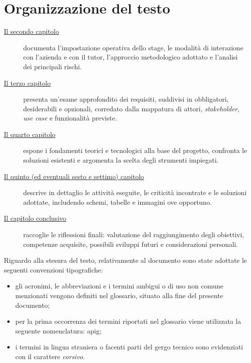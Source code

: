 \section{Organizzazione del testo}
\begin{description}
    \item[{\hyperref[chap:descrizione-stage]{Il secondo capitolo}}] documenta l’impostazione operativa dello stage, le modalità di interazione con l’azienda e con il tutor, l’approccio metodologico adottato e l’analisi dei principali rischi.

    \item[{\hyperref[chap:analisi-requisiti]{Il terzo capitolo}}] presenta un’esame approfondito dei requisiti, suddivisi in obbligatori, desiderabili e opzionali, corredato dalla mappatura di attori, \textit{stakeholder}, \textit{use case} e funzionalità previste.

    \item[{\hyperref[chap:introduzione-teorica]{Il quarto capitolo}}] espone i fondamenti teorici e tecnologici alla base del progetto, confronta le soluzioni esistenti e argomenta la scelta degli strumenti impiegati.

    \item[{\hyperref[chap:lavoro-svolto]{Il quinto (ed eventuali sesto e settimo) capitolo}}] descrive in dettaglio le attività eseguite, le criticità incontrate e le soluzioni adottate, includendo schemi, tabelle e immagini ove opportuno.

    \item[{\hyperref[chap:conclusioni]{Il capitolo conclusivo}}] raccoglie le riflessioni finali: valutazione del raggiungimento degli obiettivi, competenze acquisite, possibili sviluppi futuri e considerazioni personali.
\end{description}




Riguardo alla stesura del testo, relativamente al documento sono state adottate le seguenti convenzioni tipografiche:
\begin{itemize}
  \item gli acronimi, le abbreviazioni e i termini ambigui o di uso non comune menzionati vengono definiti nel glossario, situato alla fine del presente documento;
  \item per la prima occorrenza dei termini riportati nel glossario viene utilizzata la seguente nomenclatura: \gls{apig};
  \item i termini in lingua straniera o facenti parti del gergo tecnico sono evidenziati con il carattere \textit{corsivo}.
\end{itemize}

\newpage
